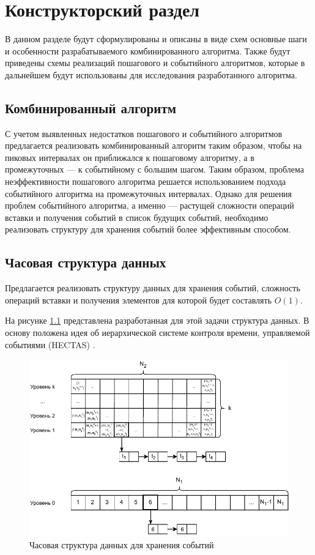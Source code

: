 \chapter{Конструкторский раздел}
В данном разделе будут сформулированы и описаны в виде схем основные шаги и особенности разрабатываемого комбинированного алгоритма. Также будут приведены схемы реализаций пошагового и событийного алгоритмов, которые в дальнейшем будут использованы для исследования разработанного алгоритма.

\section{Комбинированный алгоритм}
С учетом выявленных недостатков пошагового и событийного алгоритмов предлагается реализовать комбинированный алгоритм таким образом, чтобы на пиковых интервалах он приближался к пошаговому алгоритму, а в промежуточных --- к событийному с большим шагом. Таким образом, проблема неэффективности пошагового алгоритма решается использованием подхода событийного алгоритма на промежуточных интервалах. Однако для решения проблем событийного алгоритма, а именно --- растущей сложности операций вставки и получения событий в список будущих событий, необходимо реализовать структуру для хранения событий более эффективным способом.

\section{Часовая структура данных}
Предлагается реализовать структуру данных для хранения событий, сложность операций вставки и получения элементов для которой будет составлять $O(1)$.

На рисунке \ref{img:hybrid_structure} представлена разработанная для этой задачи структура данных. В основу положена идея об иерархической системе контроля времени, управляемой событиями (HECTAS) \cite{system_modelling_eng}.

\begin{figure}[h!btp]
	\centering
	\includegraphics[width=1\columnwidth]{inc/img/hybrid_structure.pdf}
	\caption{Часовая структура данных для хранения событий}
	\label{img:hybrid_structure}	
\end{figure}

